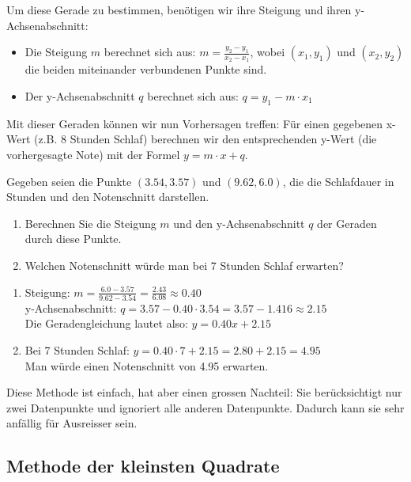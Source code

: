 Um diese Gerade zu bestimmen, benötigen wir ihre Steigung und ihren y-Achsenabschnitt:

\begin{itemize}
	\item Die Steigung $m$ berechnet sich aus: $m = \frac{y_2 - y_1}{x_2 - x_1}$, wobei $(x_1, y_1)$ und $(x_2, y_2)$ die beiden miteinander verbundenen Punkte sind.
	\item Der y-Achsenabschnitt $q$ berechnet sich aus: $q = y_1 - m \cdot x_1$
\end{itemize}

Mit dieser Geraden können wir nun Vorhersagen treffen: Für einen gegebenen x-Wert (z.B. 8 Stunden Schlaf) berechnen wir den entsprechenden y-Wert (die vorhergesagte Note) mit der Formel $y = m \cdot x + q$.

\begin{myexercise}
	Gegeben seien die Punkte $(3.54, 3.57)$ und $(9.62, 6.0)$, die die Schlafdauer in Stunden und den Notenschnitt darstellen.
	\begin{enumerate}
		\item Berechnen Sie die Steigung $m$ und den y-Achsenabschnitt $q$ der Geraden durch diese Punkte.
		\item Welchen Notenschnitt würde man bei 7 Stunden Schlaf erwarten?
	\end{enumerate}
	\begin{myanswer}
		\begin{enumerate}
			\item Steigung: $m = \frac{6.0 - 3.57}{9.62 - 3.54} = \frac{2.43}{6.08} \approx 0.40$\\
			      y-Achsenabschnitt: $q = 3.57 - 0.40 \cdot 3.54 = 3.57 - 1.416 \approx 2.15$\\
			      Die Geradengleichung lautet also: $y = 0.40x + 2.15$
			\item Bei 7 Stunden Schlaf: $y = 0.40 \cdot 7 + 2.15 = 2.80 + 2.15 = 4.95$\\
			      Man würde einen Notenschnitt von 4.95 erwarten.
		\end{enumerate}
	\end{myanswer}
\end{myexercise}

Diese Methode ist einfach, hat aber einen grossen Nachteil: Sie berücksichtigt nur zwei Datenpunkte und ignoriert alle anderen Datenpunkte. Dadurch kann sie sehr anfällig für Ausreisser sein.

\subsection{Methode der kleinsten Quadrate}

